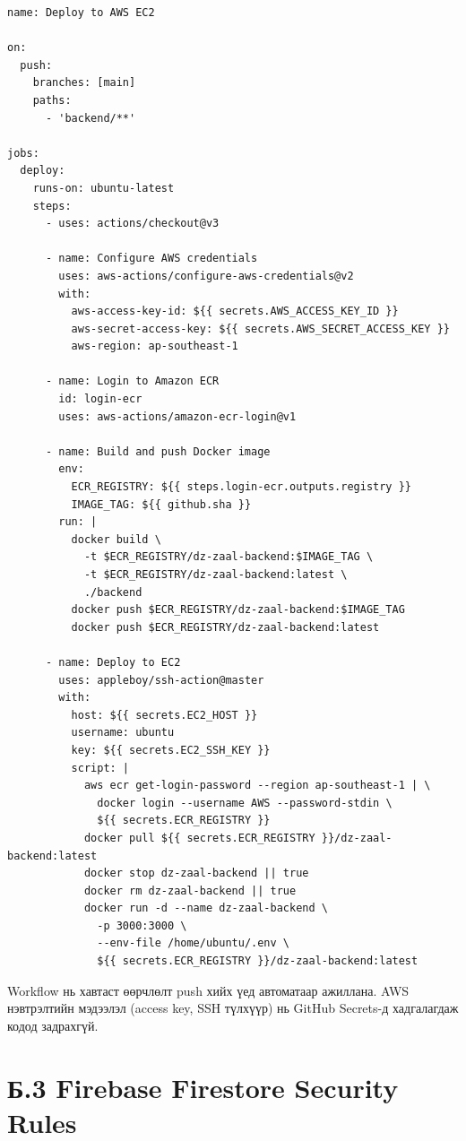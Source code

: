 \begin{lstlisting}[language={}, caption={.github/workflows/deploy.yml}]
name: Deploy to AWS EC2

on:
  push:
    branches: [main]
    paths:
      - 'backend/**'

jobs:
  deploy:
    runs-on: ubuntu-latest
    steps:
      - uses: actions/checkout@v3

      - name: Configure AWS credentials
        uses: aws-actions/configure-aws-credentials@v2
        with:
          aws-access-key-id: ${{ secrets.AWS_ACCESS_KEY_ID }}
          aws-secret-access-key: ${{ secrets.AWS_SECRET_ACCESS_KEY }}
          aws-region: ap-southeast-1

      - name: Login to Amazon ECR
        id: login-ecr
        uses: aws-actions/amazon-ecr-login@v1

      - name: Build and push Docker image
        env:
          ECR_REGISTRY: ${{ steps.login-ecr.outputs.registry }}
          IMAGE_TAG: ${{ github.sha }}
        run: |
          docker build \
            -t $ECR_REGISTRY/dz-zaal-backend:$IMAGE_TAG \
            -t $ECR_REGISTRY/dz-zaal-backend:latest \
            ./backend
          docker push $ECR_REGISTRY/dz-zaal-backend:$IMAGE_TAG
          docker push $ECR_REGISTRY/dz-zaal-backend:latest

      - name: Deploy to EC2
        uses: appleboy/ssh-action@master
        with:
          host: ${{ secrets.EC2_HOST }}
          username: ubuntu
          key: ${{ secrets.EC2_SSH_KEY }}
          script: |
            aws ecr get-login-password --region ap-southeast-1 | \
              docker login --username AWS --password-stdin \
              ${{ secrets.ECR_REGISTRY }}
            docker pull ${{ secrets.ECR_REGISTRY }}/dz-zaal-backend:latest
            docker stop dz-zaal-backend || true
            docker rm dz-zaal-backend || true
            docker run -d --name dz-zaal-backend \
              -p 3000:3000 \
              --env-file /home/ubuntu/.env \
              ${{ secrets.ECR_REGISTRY }}/dz-zaal-backend:latest
\end{lstlisting}

Workflow нь \code{backend/} хавтаст өөрчлөлт push хийх үед автоматаар ажиллана. AWS нэвтрэлтийн мэдээлэл (access key, SSH түлхүүр) нь GitHub Secrets-д хадгалагдаж кодод задрахгүй.


\section*{Б.3 Firebase Firestore Security Rules}

